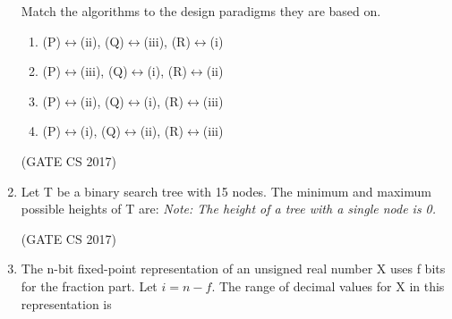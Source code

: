 \documentclass[a4paper, 11pt]{article}
\begin{document}
\begin{enumerate}
    Match the algorithms to the design paradigms they are based on.
    
    \begin{enumerate}
        \item (P)$\leftrightarrow$(ii), (Q)$\leftrightarrow$(iii), (R)$\leftrightarrow$(i)
        \item (P)$\leftrightarrow$(iii), (Q)$\leftrightarrow$(i), (R)$\leftrightarrow$(ii)
        \item (P)$\leftrightarrow$(ii), (Q)$\leftrightarrow$(i), (R)$\leftrightarrow$(iii)
        \item (P)$\leftrightarrow$(i), (Q)$\leftrightarrow$(ii), (R)$\leftrightarrow$(iii)
    \end{enumerate}
    
    \hfill (GATE CS 2017)
    
    \item Let T be a binary search tree with 15 nodes. The minimum and maximum possible heights of T are: \textit{Note: The height of a tree with a single node is 0.}
    
    \begin{enumerate}
    \end{enumerate}
    
    \hfill (GATE CS 2017)
    
    \item The n-bit fixed-point representation of an unsigned real number X uses f bits for the fraction part. Let $i=n-f$. The range of decimal values for X in this representation is
    
    \begin{enumerate}
    \end{enumerate}
    

\end{enumerate}
\end{document}
